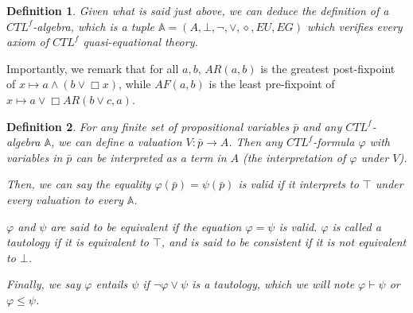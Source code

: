 \documentclass[11pt]{article}
\newtheorem{definition}{Definition}[section]
\begin{document}
\begin{definition}\label{CTLf-algebra}
    Given what is said just above, we can deduce the definition of a \emph{$CTL^f$-algebra}, which is a tuple $\mathbb{A}=(A,\bot,\neg,\vee,\diamond,EU,EG)$ which verifies every axiom of $CTL^f$ quasi-equational theory.
\end{definition}
Importantly, we remark that for all $a,b$, $AR(a,b)$ is the greatest post-fixpoint of $x \mapsto a \wedge (b \vee \Box x)$, while $AF(a,b)$ is the least pre-fixpoint of $x \mapsto a \vee \Box AR(b\vee c,a)$.
\begin{definition}\label{interp_form_algebra}
    For any finite set of propositional variables $\bar{p}$ and any $CTL^f$-algebra $\mathbb{A}$, we can define a \emph{valuation} $V:\bar{p}\to A$. Then any $CTL^f$-formula $\varphi$ with variables in $\bar{p}$ can be interpreted as a term in $A$ (the \emph{interpretation} of $\varphi$ under $V$).

    Then, we can say the equality $\varphi(\bar{p})=\psi(\bar{p})$ is \emph{valid} if it interprets to $\top$ under every valuation to every $\mathbb{A}$.

    $\varphi$ and $\psi $ are said to be \emph{equivalent} if the equation $\varphi = \psi$ is valid. $\varphi$ is called a \emph{tautology} if it is equivalent to $\top$, and is said to be \emph{consistent} if it is not equivalent to $\bot$.

    Finally, we say $\varphi$ \emph{entails} $\psi$ if $\neg \varphi \vee \psi$ is a tautology, which we will note $\varphi \vdash \psi$ or $\varphi \leq \psi$.
\end{definition}
\end{document}

